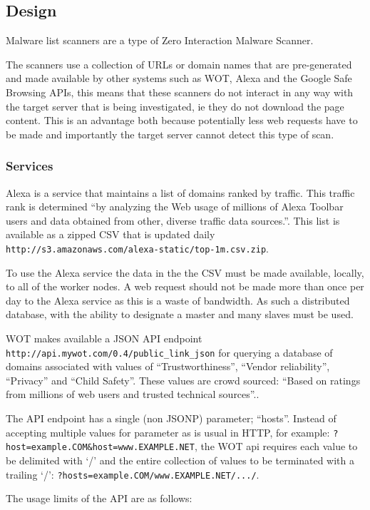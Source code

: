 \subsection{Design}
Malware list scanners are a type of Zero Interaction Malware Scanner.

The scanners use a collection of URLs or domain names that are pre-generated and made available by other systems such as WOT, Alexa and the Google Safe Browsing APIs, this means that these scanners do not interact in any way with the target server that is being investigated, ie they do not download the page content. This is an advantage both because potentially less web requests have to be made and importantly the target server cannot detect this type of scan.

\subsubsection{Services}
Alexa is a service that maintains a list of domains ranked by traffic. This traffic rank is determined ``by analyzing the Web usage of millions of Alexa Toolbar users and data obtained from other, diverse traffic data sources.''\cite{alexa-about}. This list is available as a zipped CSV that is updated daily \verb`http://s3.amazonaws.com/alexa-static/top-1m.csv.zip`.

To use the Alexa service the data in the the CSV must be made available, locally, to all of the worker nodes. A web request should not be made more than once per day to the Alexa service as this is a waste of bandwidth. As such a distributed database, with the ability to designate a master and many slaves must be used.

WOT makes available a JSON API endpoint \verb`http://api.mywot.com/0.4/public_link_json` for querying a database of domains associated with values of ``Trustworthiness'', ``Vendor reliability'', ``Privacy'' and ``Child Safety''. These values are crowd sourced: ``Based on ratings from millions of web users and trusted technical sources''.\cite{wot-about}.

The API endpoint has a single (non JSONP\cite{JSONP}) parameter; ``hosts''. Instead of accepting multiple values for parameter as is usual in HTTP, for example: \verb`?host=example.COM&host=www.EXAMPLE.NET`, the WOT api requires each value to be delimited with `/' and the entire collection of values to be terminated with a trailing `/': \verb`?hosts=example.COM/www.EXAMPLE.NET/.../`.

The usage limits of the API are as follows\cite{wot-about}:

